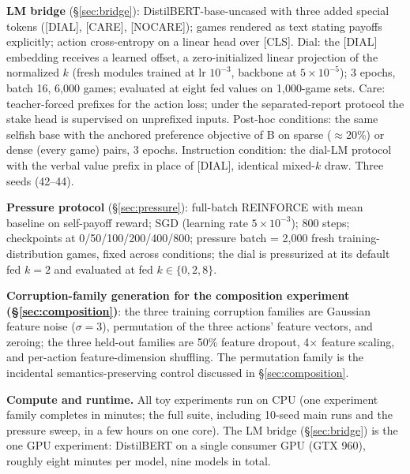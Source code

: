 \documentclass[manuscript, screen, review]{jair}
\begin{document}
\textbf{LM bridge} (\S\ref{sec:bridge}): DistilBERT-base-uncased with three added special
tokens ([DIAL], [CARE], [NOCARE]); games rendered as text stating payoffs explicitly;
action cross-entropy on a linear head over [CLS]. Dial: the [DIAL] embedding receives a
learned offset, a zero-initialized linear projection of the normalized $k$ (fresh modules
trained at lr $10^{-3}$, backbone at $5{\times}10^{-5}$); 3 epochs, batch 16, 6{,}000
games; evaluated at eight fed values on 1{,}000-game sets. Care: teacher-forced prefixes
for the action loss; under the separated-report protocol the stake head is supervised on
unprefixed inputs. Post-hoc conditions: the same selfish base with the anchored preference objective of B on sparse ($\approx$20\%) or dense (every game) pairs, 3 epochs. Instruction condition: the dial-LM protocol with the verbal value prefix in place of [DIAL], identical mixed-$k$ draw. Three seeds (42--44).

\textbf{Pressure protocol} (\S\ref{sec:pressure}): full-batch REINFORCE with mean baseline on
self-payoff reward; SGD (learning rate $5\times10^{-3}$); 800 steps; checkpoints at
0/50/100/200/400/800; pressure batch = 2{,}000 fresh training-distribution games, fixed across
conditions; the dial is pressurized at its default fed $k{=}2$ and evaluated at fed
$k \in \{0, 2, 8\}$.

\textbf{Corruption-family generation for the composition experiment (\S\ref{sec:composition})}: the three training
corruption families are Gaussian feature noise ($\sigma{=}3$), permutation of the three
actions' feature vectors, and zeroing; the three held-out families are 50\% feature dropout,
4$\times$ feature scaling, and per-action feature-dimension shuffling. The permutation family
is the incidental semantics-preserving control discussed in \S\ref{sec:composition}.

\textbf{Compute and runtime.} All toy experiments run on CPU (one experiment family completes in
minutes; the full suite, including 10-seed main runs and the pressure sweep, in a few hours on
one core). The LM bridge (\S\ref{sec:bridge}) is the one GPU experiment: DistilBERT on a single
consumer GPU (GTX 960), roughly eight minutes per model, nine models in total.
\end{document}
